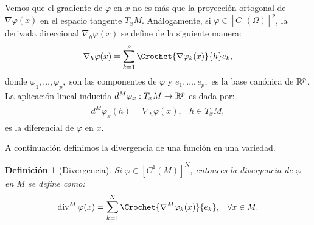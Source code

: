 \documentclass[a4paper,11pt,spanish, twoside, leqno]{tfm-uam}
\newtheorem{defi}[teo]{Definición}
\begin{document}
Vemos que el gradiente de $\varphi$ en $x$ no es más que la proyección ortogonal de $\nabla{\varphi(x)}$ en el espacio tangente $T_{x}M$. Análogamente, si $\varphi\in [C^{1}(\Omega)]^{p}$, la derivada direccional $\nabla_{h}\varphi(x)$ se define de la siguiente manera:
\begin{align*}
\nabla_{h}\varphi(x)=\sum^{p}_{k=1}\Crochet{\nabla{\varphi_{k}(x)}}{h}e_{k},
\end{align*}
donde $\varphi_{1},\ldots, \varphi_{p},$ son las componentes de $\varphi$ y $e_{1}, \ldots,e_{p},$ es la base canónica de $\mathbb{R}^{p}$. La aplicación lineal inducida $d^{M}\varphi_{x}:T_{x}M\to \mathbb{R}^{p}$ es dada por:
\begin{align*}
\begin{array}{ll}
d^{M}\varphi_{x}(h)=\nabla_{h}\varphi(x),& h\in T_{x}M,
\end{array}
\end{align*}
es la diferencial de $\varphi$ en $x$.

A continuación definimos la divergencia de una función en una variedad.
\begin{defi}[Divergencia]\label{defi:Divergencia} 
Si $\varphi\in [C^{1}(M)]^{N}$, entonces la divergencia de $\varphi$ en $M$ se define como:
\begin{align}\label{defi:Divergencia:eq:1}
\begin{array}{ll}
\displaystyle\div^{M}\varphi(x)=\sum^{N}_{k=1}\Crochet{\nabla^{M}\varphi_{k}(x)}{e_{k}},& \forall x\in M.
\end{array}
\end{align}
\end{defi}
\end{document}

